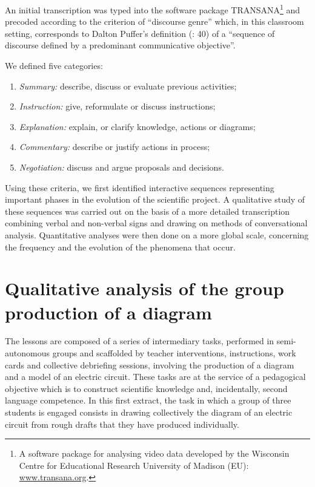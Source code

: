 \documentclass[output=paper]{langscibook}
\begin{document}
An initial transcription was typed into the software package TRANSANA\footnote{A software package for analysing video data developed by the Wisconsin Centre for Educational Research University of Madison (EU): \href{http://www.transana.org}{www.transana.org}.} and precoded according to the criterion of “discourse genre” which, in this classroom setting, corresponds to Dalton Puffer’s definition (\citeyear{Dalton-Puffer2007}: 40) of a “sequence of discourse defined by a predominant communicative objective”.

We defined five categories:

\begin{enumerate}
\item \textit{Summary:} describe, discuss or evaluate previous activities;
\item \textit{Instruction:} give, reformulate or discuss instructions;
\item \textit{Explanation:} explain, or clarify knowledge, actions or diagrams;
\item \textit{Commentary:} describe or justify actions in process;
\item \textit{Negotiation:} discuss and argue proposals and decisions.
\end{enumerate}

Using these criteria, we first identified interactive sequences representing important phases in the evolution of the scientific project. A qualitative study of these sequences was carried out on the basis of a more detailed transcription combining verbal and non-verbal signs and drawing on methods of conversational analysis. Quantitative analyses were then done on a more global scale, concerning the frequency and the evolution of the phenomena that occur.

\section{Qualitative analysis of the group production of a diagram} %

The lessons are composed of a series of intermediary tasks, performed in semi-autonomous groups and scaffolded by teacher interventions, instructions, work cards and collective debriefing sessions, involving the production of a diagram and a model of an electric circuit. These tasks are at the service of a pedagogical objective which is to construct scientific knowledge and, incidentally, second language competence. In this first extract, the task in which a group of three students is engaged consists in drawing collectively the diagram of an electric circuit from rough drafts that they have produced individually. 
\end{document}
